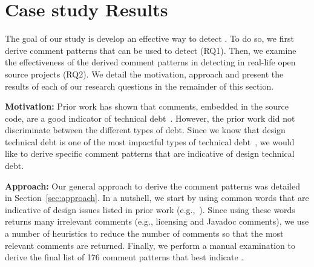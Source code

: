 \section{Case study Results}
\label{sec:case_study_results}

The goal of our study is develop an effective way to detect \SADTD. To do so, we first derive comment patterns that can be used to detect \SADTD (RQ1). Then, we examine the effectiveness of the derived comment patterns in detecting \SADTD in real-life open source projects (RQ2). We detail the motivation, approach and present the results of each of our research questions in the remainder of this section.


\rqi

\noindent \textbf{Motivation:} 
Prior work has shown that comments, embedded in the source code, are a good indicator of technical debt~\cite{Potdar2014ICSME}. However, the prior work did not discriminate between the different types of debt. Since we know that design technical debt is one of the most impactful types of technical debt~\cite{Marinescu2012IBM}, we would like to derive specific comment patterns that are indicative of design technical debt.


\noindent \textbf{Approach:} Our general approach to derive the \SADTD comment patterns was detailed in Section~\ref{sec:approach}. In a nutshell, we start by using common words that are indicative of design issues listed in prior work (e.g.,~\cite{fowler1999refactoring, brown1998antipatterns,martin2009clean}). Since using these words returns many irrelevant comments (e.g., licensing and Javadoc comments), we use a number of heuristics to reduce the number of comments so that the most relevant comments are returned. Finally, we perform a manual examination to derive the final list of 176 comment patterns that best indicate \SADTD.

